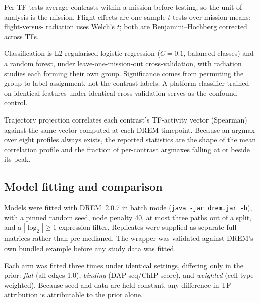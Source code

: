 Per-TF tests average contrasts within a mission before testing, so the unit of analysis is
the mission. Flight effects are one-sample $t$ tests over mission means; flight-versus-
radiation uses Welch's $t$; both are Benjamini--Hochberg corrected across TFs.

Classification is L2-regularised logistic regression ($C = 0.1$, balanced classes) and a
random forest, under leave-one-mission-out cross-validation, with radiation studies each
forming their own group. Significance comes from permuting the group-to-label assignment,
not the contrast labels. A platform classifier trained on identical features under
identical cross-validation serves as the confound control.

Trajectory projection correlates each contrast's TF-activity vector (Spearman) against the
same vector computed at each DREM timepoint. Because an argmax over eight profiles always
exists, the reported statistics are the shape of the mean correlation profile and the
fraction of per-contrast argmaxes falling at or beside its peak.

\subsection{Model fitting and comparison}

Models were fitted with DREM~2.0.7 \citep{dremsoftware} in batch mode
(\texttt{java -jar drem.jar -b}), with a pinned random seed, node penalty 40, at most
three paths out of a split, and a $|\log_2| \ge 1$ expression filter. Replicates were
supplied as separate full matrices rather than pre-medianed. The wrapper was validated
against DREM's own bundled example before any study data was fitted.

Each arm was fitted three times under identical settings, differing only in the prior:
\emph{flat} (all edges 1.0), \emph{binding} (DAP-seq/ChIP score), and \emph{weighted}
(cell-type-weighted). Because seed and data are held constant, any difference in TF
attribution is attributable to the prior alone.
